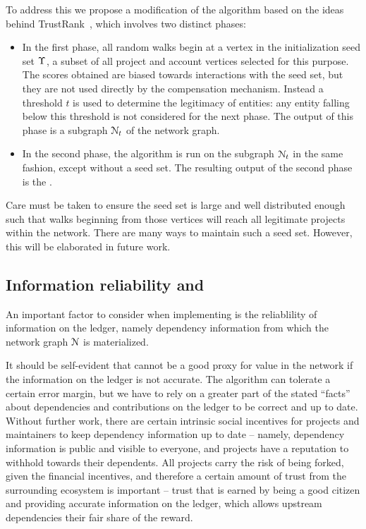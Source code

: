 To address this we propose a modification of the \pagerank{} algorithm based
on the ideas behind TrustRank~\cite{trustrank}, which involves two distinct
phases:

\begin{itemize}
\item In the first phase, all random walks begin at a vertex in the
  initialization seed set $\Upsilon$, a subset of all project and account
  vertices selected for this purpose.
  The scores obtained are biased towards interactions with the seed set, but
  they are not used directly by the compensation mechanism. Instead a threshold
  $t$ is used to determine the legitimacy of entities: any entity falling below
  this threshold is not considered for the next phase. The output of this phase
  is a subgraph $\mathcal{N}_t$ of the network graph.
\item In the second phase, the algorithm is run on the subgraph $\mathcal{N}_t$
  in the same fashion, except without a seed set. The resulting output of the
  second phase is the \osrank{}.
\end{itemize}
Care must be taken to ensure the seed set is large and well distributed enough
such that walks beginning from those vertices will reach all legitimate
projects within the network. There are many ways to maintain such a seed set.
However, this will be elaborated in future work.

\subsection{Information reliability and \osrank{}}

An important factor to consider when implementing \osrank{} is the reliablility
of information on the ledger, namely dependency information from which the
network graph $\mathcal{N}$ is materialized.

It should be self-evident that \osrank{} cannot be a good proxy for value in
the network if the information on the ledger is not accurate. The algorithm can
tolerate a certain error margin, but we have to rely on a greater part of the
stated ``facts'' about dependencies and contributions on the ledger to be
correct and up to date. Without further work, there are certain intrinsic
social incentives for projects and maintainers to keep dependency information
up to date -- namely, dependency information is public and visible to everyone,
and projects have a reputation to withhold towards their dependents. All
projects carry the risk of being forked, given the financial incentives, and
therefore a certain amount of trust from the surrounding ecosystem is important --
trust that is earned by being a good citizen and providing accurate information
on the ledger, which allows upstream dependencies their fair share of the reward.

